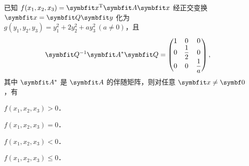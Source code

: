 \begin{question}[index=6]
已知 $f(x_1,x_2,x_3)=\symbfit x^{\mathrm T}\symbfit A\symbfit x$
经正交变换 $\symbfit x=\symbfit Q\symbfit y$ 化为
$g(y_1,y_2,y_3)=y_1^2+2y_2^2+ay_3^2\ (a\ne0)$，且
\[
\symbfit Q^{-1}\symbfit A^*\symbfit Q=\begin{pmatrix}1&0&0\\0&\dfrac12&0\\0&0&\dfrac1a\end{pmatrix},
\]
其中 $\symbfit A^*$ 是 $\symbfit A$ 的伴随矩阵，则对任意 $\symbfit x\ne\symbf0$，有
\begin{choices}[columns=2]
\item $f(x_1,x_2,x_3)>0$．
\item $f(x_1,x_2,x_3)=0$．
\item $f(x_1,x_2,x_3)<0$．
\item $f(x_1,x_2,x_3)\le0$．
\end{choices}
\end{question}
\QuestionBreak

